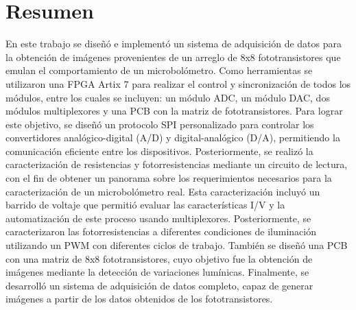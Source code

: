 \chapter{Resumen}

En este trabajo se diseñó e implementó un sistema de adquisición de datos para la obtención de imágenes provenientes de un arreglo de 8x8 fototransistores que emulan el comportamiento de un microbolómetro. Como herramientas se utilizaron una FPGA Artix 7 para realizar el control y sincronización de todos los módulos, entre los cuales se incluyen: un módulo ADC, un módulo DAC, dos módulos multiplexores y una PCB con la matriz de fototransistores. Para lograr este objetivo, se diseñó un protocolo SPI personalizado para controlar los convertidores analógico-digital (A/D) y digital-analógico (D/A), permitiendo la comunicación eficiente entre los dispositivos. Posteriormente, se realizó la caracterización de resistencias y fotorresistencias mediante un circuito de lectura, con el fin de obtener un panorama sobre los requerimientos necesarios para la caracterización de un microbolómetro real. Esta caracterización incluyó un barrido de voltaje que permitió evaluar las características I/V y la automatización de este proceso usando multiplexores. Posteriormente, se caracterizaron las fotorresistencias a diferentes condiciones de iluminación utilizando un PWM con diferentes ciclos de trabajo. También se diseñó una PCB con una matriz de 8x8 fototransistores, cuyo objetivo fue la obtención de imágenes mediante la detección de variaciones lumínicas. Finalmente, se desarrolló un sistema de adquisición de datos completo, capaz de generar imágenes a partir de los datos obtenidos de los fototransistores.
    